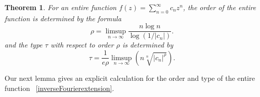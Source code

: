 \documentclass[graybox]{svmult}
\newtheorem{mainthm}{Theorem}
\begin{document}
\begin{mainthm}\cite[Theorem 2 and 3 in Lecture 1]{levin1996lectures}
    For an entire function $f(z) = \sum_{n=0}^{\infty}c_n z^n$, the order of the entire function is determined by the formula
    \begin{equation}\label{OrderCalculation}
        \rho = \limsup_{n \to \infty} \frac{n \log n}{\log (1/|c_n|)}.
    \end{equation}
    and the type $\tau$ with respect to order $\rho$ is determined by
    \begin{equation}\label{TypeCalculation}
        \tau = \frac{1}{e\rho} \limsup_{n \to\infty} (n \sqrt[n]{|c_n|^{\rho}}).
    \end{equation}
\end{mainthm}
Our next lemma gives an explicit calculation for the order and type of the entire function ~\eqref{inverseFourierextension}.
\end{document}
